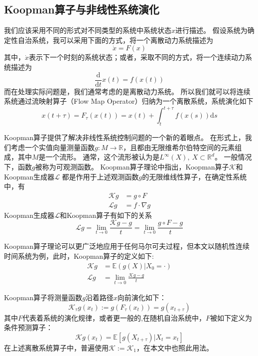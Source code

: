 \documentclass[AutoFakeBold]{LZUThesis}
\begin{document}
\subsection{Koopman算子与非线性系统演化}
我们应该采用不同的形式对不同类型的系统中系统状态$x$进行描述。
假设系统为确定性自治系统，我可以采用下面的方式，将一个离散动力系统描述为
\begin{equation}
  \dot{x} = F(x)
\end{equation}
其中，$\Dot{x}$表示下一个时刻的系统状态；或者，采取不同的方式，将一个连续动力系统描述为
\begin{equation}
  \frac{\mathrm{d}}{\mathrm{d}t} x(t) = f(x(t))
\end{equation}
而在处理实际问题是，我们通常考虑的是离散动力系统。
所以我们就可以将连续系统通过流映射算子（Flow Map Operator）归纳为一个离散系统，系统演化如下
\begin{equation}
  x(t + \tau) = F_\tau(x(t)) = x(t) + \int^{t + \tau}_t f(x(s)) \mathrm{d}s
\end{equation}

Koopman算子提供了解决非线性系统控制问题的一个新的着眼点。
在形式上，我们考虑一个实值向量测量函数$g: M \to \mathbb{R}$，且都由无限维希尔伯特空间的元素组成，其中$M$是一个流形。
通常，这个流形被认为是$L^\infty(X), \ X \subset \mathbb{R}^d$。
一般情况下，函数$g$被称为可观测函数。
Koopman算子理论中指出，Koopman算子$\mathcal{K}$和Koopman生成器$\mathcal{L}$
都是作用于上述观测函数$g$的无限维线性算子，在确定性系统中，有
\begin{subequations}
  \begin{align}
    \mathcal{K}g &= g \circ F \\
    \mathcal{L}g &= f \cdot \nabla g
  \end{align}
\end{subequations}
Koopman生成器$\mathcal{L}$和Koopman算子有如下的关系
\begin{equation}
  \mathcal{L} g = \lim_{t \to 0} \frac{\mathcal{K}g - g}{t} = \lim_{t \to 0} \frac{g \circ F - g}{t}
\end{equation}

Koopman算子理论可以更广泛地应用于任何马尔可夫过程，但本文以随机性连续时间系统为例，此时，Koopman算子的定义如下:
\begin{align*}
  \mathcal{K} g &= \mathbb{E} (g(X) | X_0 = \cdot) \\
  \mathcal{L} g &= \lim_{t \to 0} \frac{\mathcal{K} g - g}{t}
\end{align*}

Koopman算子将测量函数$g$沿着路径$x$向前演化如下：
\begin{equation}
  \mathcal{K}_\tau g(x_t) := g(F_\tau(x_t)) = g(x_{t + \tau})
\end{equation}
其中$F$代表着系统的演化规律，或者更一般的,在随机自治系统中，$F$被如下定义为条件预测算子：
\begin{equation}
  \mathcal{K} g(x_t) = \mathbb{E}\left[g(X_{t + \tau}) | X_t = x_t\right]
\end{equation}
在上述离散系统算子中，普遍使用$\mathcal{K} := \mathcal{K}_1$，在本文中也照此用法。
\end{document}
